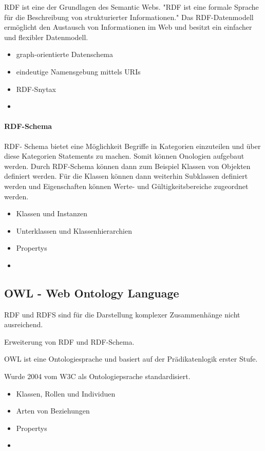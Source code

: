 \ac{RDF} ist eine der Grundlagen des Semantic Webs.
"\ac{RDF} ist eine formale Sprache für die Beschreibung von strukturierter Informationen." \citet{hitzler} 
Das RDF-Datenmodell ermöglicht den Austausch von Informationen im Web und besitzt ein einfacher und flexibler Datenmodell. \citep[vgl.]{linkeddatavisualization}

\begin{itemize}
	\item graph-orientierte Datenschema
	\item eindeutige Namensgebung mittels URIs
	\item RDF-Snytax
	\item 
\end{itemize}

\paragraph{RDF-Schema} 

RDF- Schema bietet eine Möglichkeit Begriffe in Kategorien einzuteilen und über diese Kategorien Statements zu machen.
Somit können Onologien aufgebaut werden.
Durch RDF-Schema können dann zum Beispiel Klassen von Objekten definiert werden.
Für die Klassen können dann weiterhin Subklassen definiert werden und Eigenschaften können Werte- und Gültigkeitsbereiche zugeordnet werden. \citep[vgl.]{pellegrinix}

\begin{itemize}
	\item Klassen und Instanzen
	\item Unterklassen und Klassenhierarchien
	\item Propertys
	\item 
\end{itemize}

\subsection{OWL - Web Ontology Language}

RDF und RDFS sind für die Darstellung komplexer Zusammenhänge nicht ausreichend.

Erweiterung von RDF und RDF-Schema. 

OWL ist eine Ontologiesprache und basiert auf der Prädikatenlogik erster Stufe.

Wurde 2004 vom W3C als Ontologiepsrache standardisiert.

\begin{itemize}
	\item Klassen, Rollen und Individuen
	\item Arten von Beziehungen
	\item Propertys
	\item 
\end{itemize}

